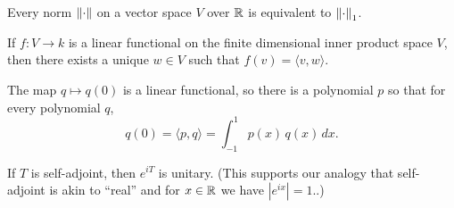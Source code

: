 \documentclass{homework}
\begin{document}
\begin{problem}\label{equivalence-of-norms}Every norm $\left\lVert\cdot\right\rVert$ on a vector space $V$ over $\mathbb{R}$ is equivalent to $\left\lVert\cdot\right\rVert_1$.
\end{problem}%

\begin{problem}
  If $f : V \to k$ is a linear functional on the finite dimensional inner product space $V$, then there exists a unique $w \in V$ such that $f(v) = \langle v, w \rangle$.
\end{problem}

\begin{problem}
  The map $q \mapsto q(0)$ is a linear functional, so there is a
  polynomial $p$ so that for every polynomial $q$,
  \[
    q(0) = \langle p, q \rangle = \int_{-1}^1 p(x) \, q(x) \, dx.
  \]
\end{problem}%

\begin{problem}
If $T$ is self-adjoint, then $e^{iT}$ is unitary.  (This supports our analogy that self-adjoint is akin to ``real'' and for $x \in \mathbb{R}$ we have $|e^{ix}| = 1$..) 
\end{problem}
\end{document}
